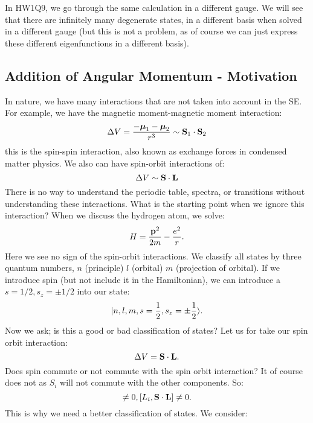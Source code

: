 In HW1Q9, we go through the same calculation in a different gauge. We will see that there are infinitely many degenerate states, in a different basis when solved in a different gauge (but this is not a problem, as of course we can just express these different eigenfunctions in a different basis).

\subsection{Addition of Angular Momentum - Motivation}
In nature, we have many interactions that are not taken into account in the SE. For example, we have the magnetic moment-magnetic moment interaction:
\begin{equation}
    \Delta V = \frac{-\mbox{\boldmath$ \mu $}_1 - \mbox{\boldmath$ \mu $}_2}{r^3} \sim \mathbf{S}_1 \cdot \mathbf{S}_2
\end{equation}
this is the spin-spin interaction, also known as exchange forces in condensed matter physics. We also can have spin-orbit interactions of:
\begin{equation}
    \Delta V \sim \mathbf{S} \cdot \mathbf{L}
\end{equation}
There is no way to understand the periodic table, spectra, or transitions without understanding these interactions. What is the starting point when we ignore this interaction? When we discuss the hydrogen atom, we solve:
\begin{equation}
    H = \frac{\mathbf{p}^2}{2m} - \frac{e^2}{r}.
\end{equation}
Here we see no sign of the spin-orbit interactions. We classify all states by three quantum numbers, $n$ (principle) $l$ (orbital) $m$ (projection of orbital). If we introduce spin (but not include it in the Hamiltonian), we can introduce a $s = 1/2, s_z = \pm 1/2$ into our state:
\begin{equation}
    \lvert n, l, m, s = \frac{1}{2}, s_z = \pm \frac{1}{2} \rangle.
\end{equation}
Now we ask; is this a good or bad classification of states? Let us for take our spin orbit interaction:
\begin{equation}
    \Delta V = \mathbf{S} \cdot \mathbf{L}.
\end{equation}
Does spin commute or not commute with the spin orbit interaction? It of course does not as $S_i$ will not commute with the other components. So:
\begin{equation}
    [S_i, \v{S} \cdot \v{L}] \neq 0, [L_i, \v{S} \cdot \v{L}] \neq 0.
\end{equation}
This is why we need a better classification of states. We consider:
